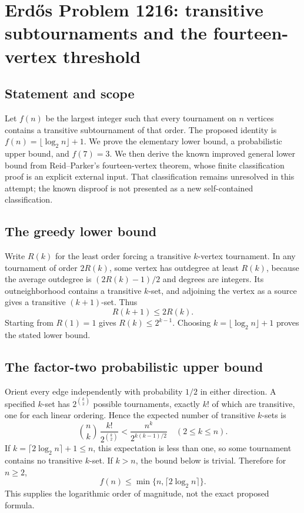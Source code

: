 \section*{Erd\H{o}s Problem 1216: transitive subtournaments and the fourteen-vertex threshold}
\subsection*{Statement and scope}
Let $f(n)$ be the largest integer such that every tournament on $n$ vertices contains a transitive subtournament of that order. The proposed identity is $f(n)=\lfloor\log_2n\rfloor+1$.
We prove the elementary lower bound, a probabilistic upper bound, and $f(7)=3$. We then derive the known improved general lower bound from Reid--Parker's fourteen-vertex theorem, whose finite classification proof is an explicit external input. That classification remains unresolved in this attempt; the known disproof is not presented as a new self-contained classification.

\subsection*{The greedy lower bound}
Write $R(k)$ for the least order forcing a transitive $k$-vertex tournament. In any tournament of order $2R(k)$, some vertex has outdegree at least $R(k)$, because the average outdegree is $(2R(k)-1)/2$ and degrees are integers. Its outneighborhood contains a transitive $k$-set, and adjoining the vertex as a source gives a transitive $(k+1)$-set. Thus
\[
 R(k+1)\le2R(k).
\]
Starting from $R(1)=1$ gives $R(k)\le2^{k-1}$. Choosing $k=\lfloor\log_2n\rfloor+1$ proves the stated lower bound.

\subsection*{The factor-two probabilistic upper bound}
Orient every edge independently with probability $1/2$ in either direction. A specified $k$-set has $2^{\binom k2}$ possible tournaments, exactly $k!$ of which are transitive, one for each linear ordering. Hence the expected number of transitive $k$-sets is
\[
 \binom nk\,\frac{k!}{2^{\binom k2}}
 <\frac{n^k}{2^{k(k-1)/2}}
 \quad(2\le k\le n).
\]
If $k=\lceil2\log_2n\rceil+1\le n$, this expectation is less than one, so some tournament contains no transitive $k$-set. If $k>n$, the bound below is trivial. Therefore for $n\ge2$,
\[
 f(n)\le\min\{n,\lceil2\log_2n\rceil\}.
\]
This supplies the logarithmic order of magnitude, not the exact proposed formula.


